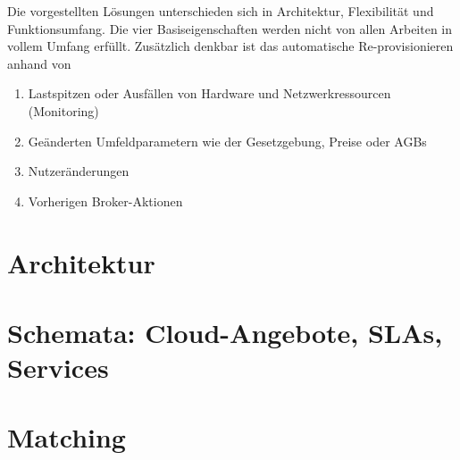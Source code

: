 Die vorgestellten Lösungen unterschieden sich in Architektur, Flexibilität und Funktionsumfang. Die vier Basiseigenschaften werden nicht von allen Arbeiten in vollem Umfang erfüllt. Zusätzlich denkbar ist das automatische Re-provisionieren anhand von 

\begin{enumerate}
	\item Lastspitzen oder Ausfällen von Hardware und Netzwerkressourcen (Monitoring)
	\item Geänderten Umfeldparametern wie der Gesetzgebung, Preise oder AGBs
	\item Nutzeränderungen
	\item Vorherigen Broker-Aktionen
\end{enumerate}


\section{Architektur}

\section{Schemata: Cloud-Angebote, SLAs, Services}

\section{Matching}
%
%
%
